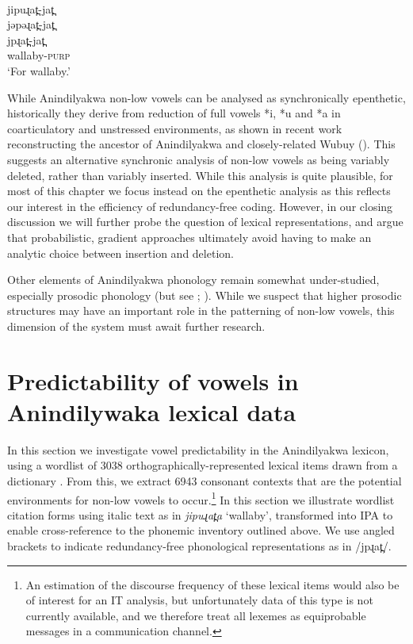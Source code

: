 \documentclass[output=paper,colorlinks,citecolor=brown]{langscibook}
\begin{document}
\ea
\label{ex:mansfield:100}
  \\
  jipuɻat̪-jat̪    \\
  jəpəɻat̪-jat̪      \\
  jpɻat̪-jat̪      \\
  wallaby-\textsc{purp}       \\
\glt ‘For wallaby.’\z
{}

While Anindilyakwa non-low vowels can be analysed as synchronically epenthetic, historically they derive from reduction of full vowels *i, *u and *a in coarticulatory and unstressed environments, as shown in recent work reconstructing the ancestor of Anindilyakwa and closely-related Wubuy (\citealt[159]{vanEgmondBaker2020}). This suggests an alternative synchronic analysis of non-low vowels as being variably deleted, rather than variably inserted. While this analysis is quite plausible, for most of this chapter we focus instead on the epenthetic analysis as this reflects our interest in the efficiency of redundancy-free coding. However, in our closing discussion we will further probe the question of lexical representations, and argue that probabilistic, gradient approaches ultimately avoid having to make an analytic choice between insertion and deletion.

Other elements of Anindilyakwa phonology remain somewhat under-studied, especially prosodic phonology (but see \citealt[138--141]{Leeding1989}; \citealt[27ff.]{vanEgmond2012}). While we suspect that higher prosodic structures may have an important role in the patterning of non-low vowels, this dimension of the system must await further research.


\section{Predictability of vowels in Anindilywaka lexical data}\label{sec:mansfield:4}


In this section we investigate vowel predictability in the Anindilyakwa lexicon, using a wordlist of 3038 orthographically-represented lexical items drawn from a dictionary \citep{Waddy1989}. From this, we extract 6943 consonant contexts that are the potential environments for non-low vowels to occur.\footnote{An estimation of the discourse frequency of these lexical items would also be of interest for an IT analysis, but unfortunately data of this type is not currently available, and we therefore treat all lexemes as equiprobable messages in a communication channel.}
In this section we illustrate wordlist citation forms using italic text as in \textit{jipuɻat̪a} ‘wallaby’, transformed into IPA to enable cross-reference to the phonemic inventory outlined above. We use angled brackets to indicate redundancy-free phonological representations as in /jpɻat̪/.
\end{document}
